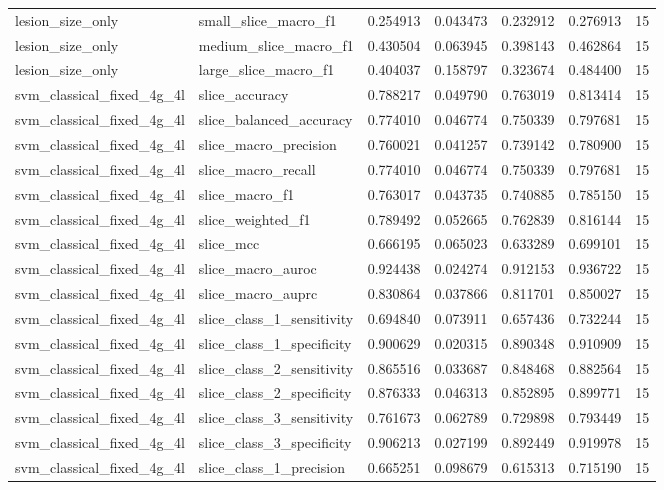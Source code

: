 \begin{tabular}{llrrrrr}
lesion_size_only & small_slice_macro_f1 & 0.254913 & 0.043473 & 0.232912 & 0.276913 & 15 \\
lesion_size_only & medium_slice_macro_f1 & 0.430504 & 0.063945 & 0.398143 & 0.462864 & 15 \\
lesion_size_only & large_slice_macro_f1 & 0.404037 & 0.158797 & 0.323674 & 0.484400 & 15 \\
svm_classical_fixed_4g_4l & slice_accuracy & 0.788217 & 0.049790 & 0.763019 & 0.813414 & 15 \\
svm_classical_fixed_4g_4l & slice_balanced_accuracy & 0.774010 & 0.046774 & 0.750339 & 0.797681 & 15 \\
svm_classical_fixed_4g_4l & slice_macro_precision & 0.760021 & 0.041257 & 0.739142 & 0.780900 & 15 \\
svm_classical_fixed_4g_4l & slice_macro_recall & 0.774010 & 0.046774 & 0.750339 & 0.797681 & 15 \\
svm_classical_fixed_4g_4l & slice_macro_f1 & 0.763017 & 0.043735 & 0.740885 & 0.785150 & 15 \\
svm_classical_fixed_4g_4l & slice_weighted_f1 & 0.789492 & 0.052665 & 0.762839 & 0.816144 & 15 \\
svm_classical_fixed_4g_4l & slice_mcc & 0.666195 & 0.065023 & 0.633289 & 0.699101 & 15 \\
svm_classical_fixed_4g_4l & slice_macro_auroc & 0.924438 & 0.024274 & 0.912153 & 0.936722 & 15 \\
svm_classical_fixed_4g_4l & slice_macro_auprc & 0.830864 & 0.037866 & 0.811701 & 0.850027 & 15 \\
svm_classical_fixed_4g_4l & slice_class_1_sensitivity & 0.694840 & 0.073911 & 0.657436 & 0.732244 & 15 \\
svm_classical_fixed_4g_4l & slice_class_1_specificity & 0.900629 & 0.020315 & 0.890348 & 0.910909 & 15 \\
svm_classical_fixed_4g_4l & slice_class_2_sensitivity & 0.865516 & 0.033687 & 0.848468 & 0.882564 & 15 \\
svm_classical_fixed_4g_4l & slice_class_2_specificity & 0.876333 & 0.046313 & 0.852895 & 0.899771 & 15 \\
svm_classical_fixed_4g_4l & slice_class_3_sensitivity & 0.761673 & 0.062789 & 0.729898 & 0.793449 & 15 \\
svm_classical_fixed_4g_4l & slice_class_3_specificity & 0.906213 & 0.027199 & 0.892449 & 0.919978 & 15 \\
svm_classical_fixed_4g_4l & slice_class_1_precision & 0.665251 & 0.098679 & 0.615313 & 0.715190 & 15 \\

\end{tabular}
